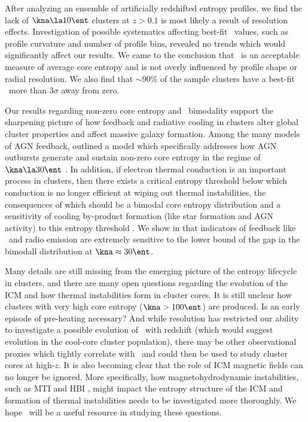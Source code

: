 \documentclass{emulateapj}
\begin{document}
After analyzing an ensemble of artificially redshifted entropy
profiles, we find the lack of $\kna \la 10 \ent$ clusters at $z > 0.1$
is most likely a result of resolution effects. Investigation of
possible systematics affecting best-fit \kna\ values, such as profile
curvature and number of profile bins, revealed no trends which would
significantly affect our results. We came to the conclusion that
\kna\ is an acceptable measure of average core entropy and is not
overly influenced by profile shape or radial resolution. We also find
that $\sim90\%$ of the sample clusters have a best-fit \kna\ more than
$3\sigma$ away from zero.

Our results regarding non-zero core entropy and \kna\ bimodality
support the sharpening picture of how feedback and radiative cooling
in clusters alter global cluster properties and affect massive galaxy
formation. Among the many models of AGN feedback, \citet{agnframework}
outlined a model which specifically addresses how AGN outbursts
generate and sustain non-zero core entropy in the regime of $\kna \la
30 \ent$ \citep[see also][]{kaiser03}. In addition, if electron
thermal conduction is an important process in clusters, then there
exists a critical entropy threshold below which conduction is no
longer efficient at wiping out thermal instabilities, the consequences
of which should be a bimodal core entropy distribution and a
sensitivity of cooling by-product formation (like star formation and
AGN activity) to this entropy threshold \citep{conduction,
  2008arXiv0804.3823G}. We show in \citet{haradent} that indicators of
feedback like \halpha\ and radio emission are extremely sensitive to
the lower bound of the gap in the bimodall distribution at $\kna
\approx 30 \ent$.

Many details are still missing from the emerging picture of the
entropy lifecycle in clusters, and there are many open questions
regarding the evolution of the ICM and how thermal instabilities form
in cluster cores. It is still unclear how clusters with very high core
entropy ($\kna > 100 \ent$) are produced. Is an early episode of
pre-heating necessary? And while resolution has restricted our ability
to investigate a possible evolution of \kna\ with redshift (which
would suggest evolution in the cool-core cluster population), there
may be other observational proxies which tightly correlate with
\kna\ and could then be used to study cluster cores at high-$z$. It is
also becoming clear that the role of ICM magnetic fields can no longer
be ignored. More specifically, how magnetohydrodynamic instabilities,
such as MTI \citep{2000ApJ...534..420B, 2008ApJ...673..758Q} and HBI
\citep{2008ApJ...677L...9P}, might impact the entropy structure of the
ICM and formation of thermal instabilities needs to be investigated
more thoroughly. We hope \accept\ will be a useful resource in
studying these questions.
\end{document}

